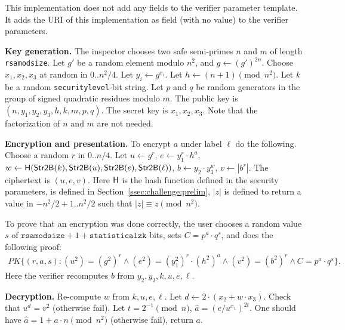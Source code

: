 \begin{description}
    This implementation does not add any fields to the verifier
    parameter template. It adds the URI of this implementation as field
    (with no value) to the verifier parameters.

    \textbf{Key generation.}
    The inspector chooses two safe semi-primes $n$ and $m$ of length \texttt{rsamodsize}.
    Let $g'$ be a random element modulo $n^2$, and $g\gets (g')^{2n}$.
    Choose $x_1, x_2, x_3$ at random in $0$..$n^2/4$.
    Let $y_i\gets g^{x_i}$. Let $h \gets (n+1)\pmod{n^2}$.
    Let $k$ be a random \texttt{securitylevel}-bit string.
    Let $p$ and $q$ be random generators in the group of signed quadratic residues modulo $m$.
    The public key is $(n, y_1, y_2, y_3, h, k, m, p, q)$.
    The secret key is $x_1, x_2, x_3$. Note that the factorization of $n$ and $m$ are not needed.

    \textbf{Encryption and presentation.}
    To encrypt $a$ under label $\ell$ do the following. Choose a random $r$ in 0..$n/4$.
    Let $u\gets g^r$, $e\gets y_1^r \cdot h^a$, $w\gets\textsf{H}(\textsf{Str2B}(k),\textsf{Str2B}(u),\textsf{Str2B}(e),\textsf{Str2B}(\ell))$,
    $b\gets y_2\cdot y_3^{w}$, $v\gets |b^r|$. The ciphertext is $(u,e,v)$.
    Here $\textsf{H}$ is the hash function defined in the security parameters,
    \stringToBytes is defined in Section~\ref{ssec:challenge:prelim},
    $|z|$ is defined to return a value in $-n^2/2+1..n^2/2$ such that $|z|\equiv z \pmod{n^2}$.

    To prove that an encryption was done correctly, the user chooses a random
    value $s$ of $\texttt{rsamodsize}+1+\texttt{statisticalzk}$ bits,
    sets $C=p^a\cdot q^s$, and does
    the following proof:
    \begin{align*}
    \mathit{PK}\lbrace (r, a, s):
    (u^2) = (g^2)^r \wedge
    (e^2) = (y_1^2)^r \cdot (h^2)^a \wedge
    (v^2) = (b^2)^r \wedge
    C = p^a \cdot q^s
    \rbrace.
    \end{align*}
    Here the verifier recomputes $b$ from $y_2, y_3, k, u, e, \ell$.

    \textbf{Decryption.}
    Re-compute $w$ from $k,u,e,\ell$.  Let $d \gets 2\cdot(x_2 + w\cdot x_3)$. Check that $u^d = v^2$ (otherwise fail).
    Let $t=2^{-1}\pmod{n}$, $\hat{a} = (e/u^{x_1})^{2t}$.
    One should have $\hat{a} = 1+a\cdot n \pmod{n^2}$ (otherwise fail), return $a$.

\end{description}

